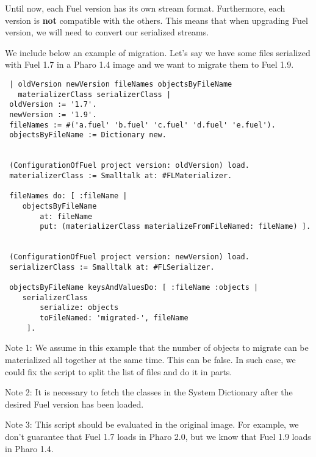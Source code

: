 \documentclass[a4paper,10pt,twoside]{book}
\begin{document}
Until now, each Fuel version has its own stream format. Furthermore, each version is \textbf{not} compatible with the others. This means that when upgrading Fuel version, we will need to convert our serialized streams. 

We include below an example of migration. Let's say we have some files serialized with Fuel 1.7 in a Pharo 1.4 image and we want to migrate them to Fuel 1.9.

\begin{lstlisting}
 | oldVersion newVersion fileNames objectsByFileName 
   materializerClass serializerClass |
 oldVersion := '1.7'.
 newVersion := '1.9'.
 fileNames := #('a.fuel' 'b.fuel' 'c.fuel' 'd.fuel' 'e.fuel').
 objectsByFileName := Dictionary new.
 

 (ConfigurationOfFuel project version: oldVersion) load.
 materializerClass := Smalltalk at: #FLMaterializer.
 
 fileNames do: [ :fileName | 
 	objectsByFileName 
 		at: fileName 
 		put: (materializerClass materializeFromFileNamed: fileName) ].
 
 
 (ConfigurationOfFuel project version: newVersion) load.
 serializerClass := Smalltalk at: #FLSerializer.
 
 objectsByFileName keysAndValuesDo: [ :fileName :objects |
 	serializerClass 
 		serialize: objects  
 		toFileNamed: 'migrated-', fileName
 	 ].
\end{lstlisting}

\begin{note}
Note 1: We assume in this example that the number of objects to migrate can be materialized all together at the same time. This can be false. In such case, we could fix the script to split the list of files and do it in parts.
\end{note}

\begin{note}
Note 2: It is necessary to fetch the classes in the System Dictionary after the desired Fuel version has been loaded.
\end{note}

\begin{note}
Note 3: This script should be evaluated in the original image. For example, we don't guarantee that Fuel 1.7 loads in Pharo 2.0, but we know that Fuel 1.9 loads in Pharo 1.4.
\end{note}


\end{document}
